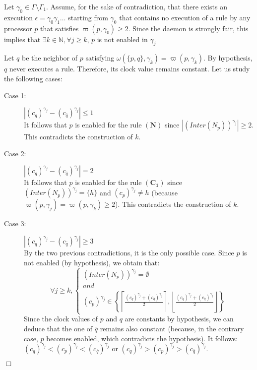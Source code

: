 \documentclass[11pt,english,letterpaper]{article}
\newenvironment{proof}{{\noindent\bf Proof. } }{{\hfill $\Box$}}
\begin{document}
\begin{proof}
Let $\gamma_{0}\in\Gamma\setminus\Gamma_{1}$. Assume, for the sake of contradiction, that there exists an execution $\epsilon=\gamma_{0}\gamma_{1}\ldots$ starting from $\gamma_{0}$ that contains no execution of a rule by any processor	$p$ that satisfies $\varpi(p,\gamma_{0})\geq 2$. Since the daemon is strongly fair, this implies that $\exists k\in\mathbb{N},\forall j\geq k$, $p$ is not enabled in $\gamma_{j}$

Let $q$ be the neighbor of $p$ satisfying $\omega(\{p,q\},\gamma_{k})=\varpi(p,\gamma_{k})$. By hypothesis, $q$ never executes a rule. Therefore, its clock value remains  constant. Let us study the following cases:

\begin{description}
\item[Case 1:] $|\left(c_{q}\right)^{\gamma_{j}}-\left(c_{\bar{q}}\right)^{\gamma_{j}}|\leq 1$\\
It follows that $p$ is enabled for the rule $\boldsymbol{(N)}$ since $|\left(Inter(N_{p})\right)^{\gamma_{j}}|\geq 2$. This contradicts the construction of $k$.

\item[Case 2:] $|\left(c_{q}\right)^{\gamma_{j}}-\left(c_{\bar{q}}\right)^{\gamma_{j}}|=2$\\
It follows that $p$ is enabled for the rule $\boldsymbol{(C_{1})}$ since $\left(Inter(N_{p})\right)^{\gamma_{j}}=\{h\}$ and $\left(c_{p}\right)^{\gamma_{j}}\neq h$ (because $\varpi(p,\gamma_{j})=\varpi(p,\gamma_{k})\geq 2$). This contradicts the construction of $k$.

\item[Case 3:] $|\left(c_{q}\right)^{\gamma_{j}}-\left(c_{\bar{q}}\right)^{\gamma_{j}}|\geq 3$\\
By the two previous contradictions, it is the only possible case. Since $p$ is not enabled (by hypothesis), we obtain that:
\[\forall j\geq k,\begin{cases} \left(Inter(N_{p})\right)^{\gamma_{j}}=\emptyset\\
and\\
\left(c_{p}\right)^{\gamma_{j}}\in\left\{\left\lceil\frac{\left(c_{q}\right)^{\gamma_{j}}+\left(c_{\bar{q}}\right)^{\gamma_{j}}}{2}\right\rceil,\left\lfloor\frac{\left(c_{q}\right)^{\gamma_{j}}+\left(c_{\bar{q}}\right)^{\gamma_{j}}}{2}\right\rfloor\right\}\end{cases}\]
Since the clock values of $p$ and $q$ are constants by hypothesis, we can deduce that the one of $\bar{q}$ remains also constant (because, in the contrary case, $p$ becomes enabled, which contradicts the hypothesis). It follows: $\left(c_{q}\right)^{\gamma_{j}}<\left(c_{p}\right)^{\gamma_{j}}<\left(c_{\bar{q}}\right)^{\gamma_{j}}$ or $\left(c_{q}\right)^{\gamma_{j}}>\left(c_{p}\right)^{\gamma_{j}}>\left(c_{\bar{q}}\right)^{\gamma_{j}}$.
\end{description}
			

\end{proof}
\end{document}
